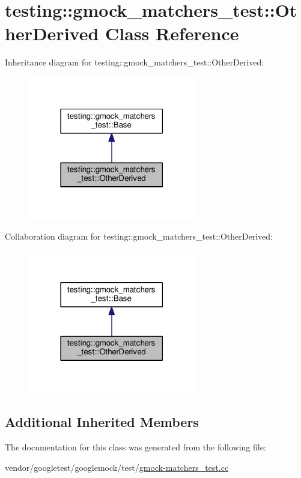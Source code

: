 \hypertarget{classtesting_1_1gmock__matchers__test_1_1OtherDerived}{}\section{testing\+:\+:gmock\+\_\+matchers\+\_\+test\+:\+:Other\+Derived Class Reference}
\label{classtesting_1_1gmock__matchers__test_1_1OtherDerived}


Inheritance diagram for testing\+:\+:gmock\+\_\+matchers\+\_\+test\+:\+:Other\+Derived\+:
\nopagebreak
\begin{figure}[H]
\begin{center}
\leavevmode
\includegraphics[width=207pt]{classtesting_1_1gmock__matchers__test_1_1OtherDerived__inherit__graph}
\end{center}
\end{figure}


Collaboration diagram for testing\+:\+:gmock\+\_\+matchers\+\_\+test\+:\+:Other\+Derived\+:
\nopagebreak
\begin{figure}[H]
\begin{center}
\leavevmode
\includegraphics[width=207pt]{classtesting_1_1gmock__matchers__test_1_1OtherDerived__coll__graph}
\end{center}
\end{figure}
\subsection*{Additional Inherited Members}


The documentation for this class was generated from the following file\+:\begin{DoxyCompactItemize}
\item 
vendor/googletest/googlemock/test/\hyperlink{gmock-matchers__test_8cc}{gmock-\/matchers\+\_\+test.\+cc}\end{DoxyCompactItemize}
